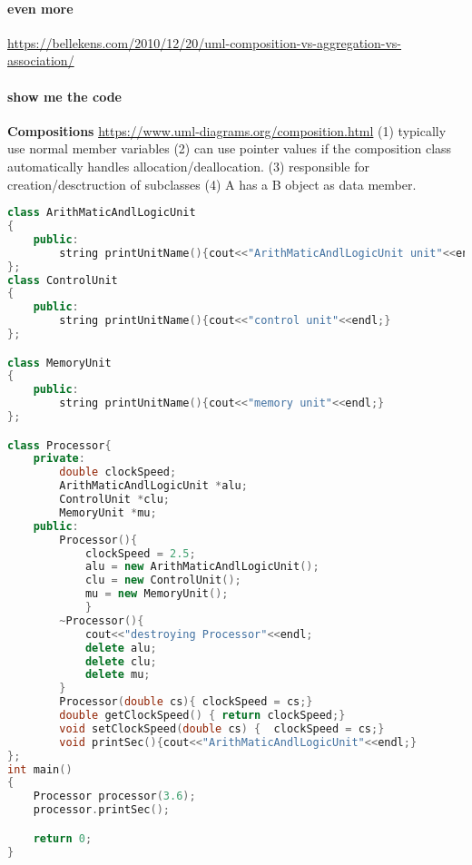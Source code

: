 \documentclass{book}
\begin{document}
\paragraph{even more}

\url{https://bellekens.com/2010/12/20/uml-composition-vs-aggregation-vs-association/}

\paragraph{show me the code}
\textbf{Compositions}
\url{https://www.uml-diagrams.org/composition.html}
(1) typically use normal member variables (2) can use pointer values if the composition class automatically handles allocation/deallocation.
(3) responsible for creation/desctruction of subclasses (4) A has a B object as data member.
\begin{lstlisting}[caption={composition example}, language=C++]
class ArithMaticAndlLogicUnit 
{
    public:
        string printUnitName(){cout<<"ArithMaticAndlLogicUnit unit"<<endl;}
};
class ControlUnit 
{
    public:
        string printUnitName(){cout<<"control unit"<<endl;}
};

class MemoryUnit
{
    public:
        string printUnitName(){cout<<"memory unit"<<endl;}
};

class Processor{
    private:
        double clockSpeed;
        ArithMaticAndlLogicUnit *alu;
        ControlUnit *clu;
        MemoryUnit *mu;
    public:
        Processor(){ 
            clockSpeed = 2.5;
            alu = new ArithMaticAndlLogicUnit();
            clu = new ControlUnit();
            mu = new MemoryUnit();
            }
        ~Processor(){ 
            cout<<"destroying Processor"<<endl;
            delete alu;
            delete clu;
            delete mu;
        }
        Processor(double cs){ clockSpeed = cs;}
        double getClockSpeed() { return clockSpeed;}
        void setClockSpeed(double cs) {  clockSpeed = cs;}
        void printSec(){cout<<"ArithMaticAndlLogicUnit"<<endl;}
};
int main()
{
    Processor processor(3.6);
    processor.printSec();

    return 0;
}

\end{lstlisting}
\end{document}
